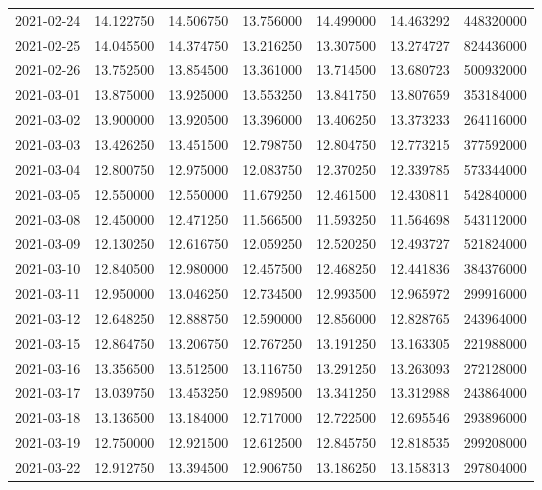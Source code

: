 \begin{tabular}{lrrrrrr}
2021-02-24 &   14.122750 &   14.506750 &   13.756000 &   14.499000 &   14.463292 &   448320000 \\
2021-02-25 &   14.045500 &   14.374750 &   13.216250 &   13.307500 &   13.274727 &   824436000 \\
2021-02-26 &   13.752500 &   13.854500 &   13.361000 &   13.714500 &   13.680723 &   500932000 \\
2021-03-01 &   13.875000 &   13.925000 &   13.553250 &   13.841750 &   13.807659 &   353184000 \\
2021-03-02 &   13.900000 &   13.920500 &   13.396000 &   13.406250 &   13.373233 &   264116000 \\
2021-03-03 &   13.426250 &   13.451500 &   12.798750 &   12.804750 &   12.773215 &   377592000 \\
2021-03-04 &   12.800750 &   12.975000 &   12.083750 &   12.370250 &   12.339785 &   573344000 \\
2021-03-05 &   12.550000 &   12.550000 &   11.679250 &   12.461500 &   12.430811 &   542840000 \\
2021-03-08 &   12.450000 &   12.471250 &   11.566500 &   11.593250 &   11.564698 &   543112000 \\
2021-03-09 &   12.130250 &   12.616750 &   12.059250 &   12.520250 &   12.493727 &   521824000 \\
2021-03-10 &   12.840500 &   12.980000 &   12.457500 &   12.468250 &   12.441836 &   384376000 \\
2021-03-11 &   12.950000 &   13.046250 &   12.734500 &   12.993500 &   12.965972 &   299916000 \\
2021-03-12 &   12.648250 &   12.888750 &   12.590000 &   12.856000 &   12.828765 &   243964000 \\
2021-03-15 &   12.864750 &   13.206750 &   12.767250 &   13.191250 &   13.163305 &   221988000 \\
2021-03-16 &   13.356500 &   13.512500 &   13.116750 &   13.291250 &   13.263093 &   272128000 \\
2021-03-17 &   13.039750 &   13.453250 &   12.989500 &   13.341250 &   13.312988 &   243864000 \\
2021-03-18 &   13.136500 &   13.184000 &   12.717000 &   12.722500 &   12.695546 &   293896000 \\
2021-03-19 &   12.750000 &   12.921500 &   12.612500 &   12.845750 &   12.818535 &   299208000 \\
2021-03-22 &   12.912750 &   13.394500 &   12.906750 &   13.186250 &   13.158313 &   297804000 \\

\end{tabular}
